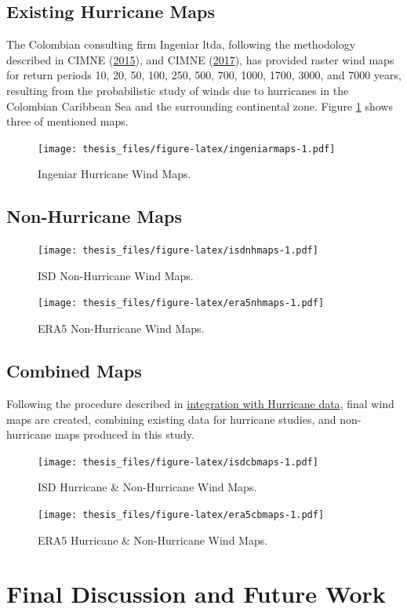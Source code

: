 \documentclass[12pt,oneside]{reedthesis}
\begin{document}
\hypertarget{existing-hurricane-maps}{%
\subsection{Existing Hurricane Maps}\label{existing-hurricane-maps}}

The Colombian consulting firm Ingeniar ltda, following the methodology described in CIMNE (\protect\hyperlink{ref-hurricanemaps}{2015}), and CIMNE (\protect\hyperlink{ref-hurricanemaps2}{2017}), has provided raster wind maps for return periods 10, 20, 50, 100, 250, 500, 700, 1000, 1700, 3000, and 7000 years, resulting from the probabilistic study of winds due to hurricanes in the Colombian Caribbean Sea and the surrounding continental zone. Figure \ref{fig:ingeniarmaps} shows three of mentioned maps.
\begin{figure}
\centering
\texttt{[image: thesis\_files/figure-latex/ingeniarmaps-1.pdf]}
\caption{\label{fig:ingeniarmaps}Ingeniar Hurricane Wind Maps.}
\end{figure}
\hypertarget{non-hurricane-maps}{%
\subsection{Non-Hurricane Maps}\label{non-hurricane-maps}}
\begin{figure}
\centering
\texttt{[image: thesis\_files/figure-latex/isdnhmaps-1.pdf]}
\caption{\label{fig:isdnhmaps}ISD Non-Hurricane Wind Maps.}
\end{figure}
\begin{figure}
\centering
\texttt{[image: thesis\_files/figure-latex/era5nhmaps-1.pdf]}
\caption{\label{fig:era5nhmaps}ERA5 Non-Hurricane Wind Maps.}
\end{figure}
\hypertarget{cm}{%
\subsection{Combined Maps}\label{cm}}

Following the procedure described in \protect\hyperlink{integration}{integration with Hurricane data}, final wind maps are created, combining existing data for hurricane studies, and non-hurricane maps produced in this study.
\begin{figure}
\centering
\texttt{[image: thesis\_files/figure-latex/isdcbmaps-1.pdf]}
\caption{\label{fig:isdcbmaps}ISD Hurricane \& Non-Hurricane Wind Maps.}
\end{figure}
\begin{figure}
\centering
\texttt{[image: thesis\_files/figure-latex/era5cbmaps-1.pdf]}
\caption{\label{fig:era5cbmaps}ERA5 Hurricane \& Non-Hurricane Wind Maps.}
\end{figure}
\hypertarget{fd}{%
\section{Final Discussion and Future Work}\label{fd}}
\end{document}
